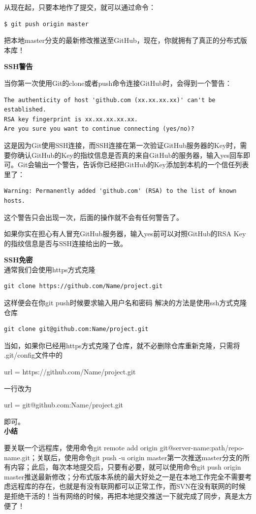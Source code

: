 \documentclass[•]{article}
\begin{document}
\begin{CJK}{UTF8}{gbsn}
从现在起，只要本地作了提交，就可以通过命令：

\begin{lstlisting} 
$ git push origin master
\end{lstlisting}

把本地master分支的最新修改推送至GitHub，现在，你就拥有了真正的分布式版本库！

\textbf{SSH警告}

\qquad 当你第一次使用Git的clone或者push命令连接GitHub时，会得到一个警告：

\begin{lstlisting}
The authenticity of host 'github.com (xx.xx.xx.xx)' can't be established.
RSA key fingerprint is xx.xx.xx.xx.xx.
Are you sure you want to continue connecting (yes/no)?
\end{lstlisting}

\qquad 这是因为Git使用SSH连接，而SSH连接在第一次验证GitHub服务器的Key时，需要你确认GitHub的Key的指纹信息是否真的来自GitHub的服务器，输入yes回车即可。Git会输出一个警告，告诉你已经把GitHub的Key添加到本机的一个信任列表里了：
\begin{lstlisting}
Warning: Permanently added 'github.com' (RSA) to the list of known hosts.
\end{lstlisting}

这个警告只会出现一次，后面的操作就不会有任何警告了。

如果你实在担心有人冒充GitHub服务器，输入yes前可以对照GitHub的RSA Key的指纹信息是否与SSH连接给出的一致。

\textbf{SSH免密}\\
通常我们会使用https方式克隆
\begin{lstlisting}
git clone https://github.com/Name/project.git
\end{lstlisting}
这样便会在你git push时候要求输入用户名和密码 
解决的方法是使用ssh方式克隆仓库
\begin{lstlisting}
git clone git@github.com:Name/project.git
\end{lstlisting}
当如，如果你已经用https方式克隆了仓库，就不必删除仓库重新克隆，只需将 .git/config文件中的 
\begin{shaded}
url = https://github.com/Name/project.git 
\end{shaded}
一行改为 
\begin{shaded}
url = git@github.com:Name/project.git 
\end{shaded}
即可。\\
\textbf{小结}

\qquad 要关联一个远程库，使用命令git remote add origin git@server-name:path/repo-name.git；关联后，使用命令git push -u origin master第一次推送master分支的所有内容；此后，每次本地提交后，只要有必要，就可以使用命令git push origin master推送最新修改；分布式版本系统的最大好处之一是在本地工作完全不需要考虑远程库的存在，也就是有没有联网都可以正常工作，而SVN在没有联网的时候是拒绝干活的！当有网络的时候，再把本地提交推送一下就完成了同步，真是太方便了！


\end{CJK}
\end{document}
